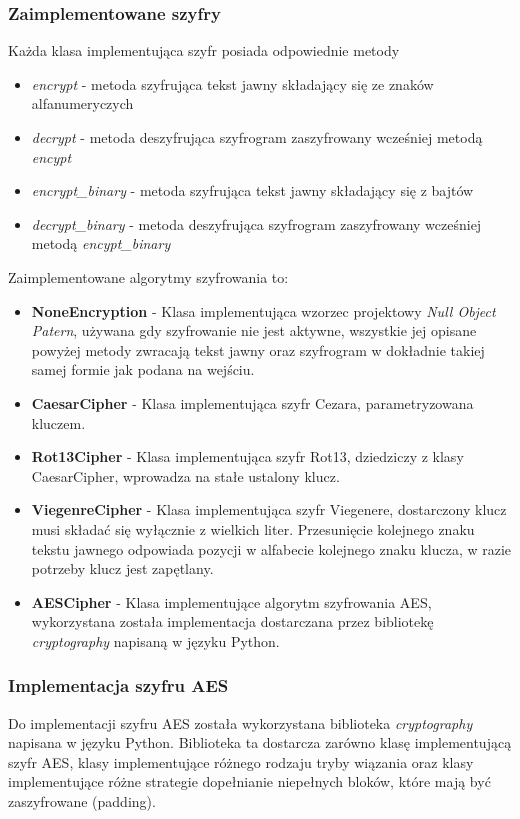 \documentclass{article}
\begin{document}
    \subsubsection{Zaimplementowane szyfry}
      Każda klasa implementująca szyfr posiada odpowiednie metody
      \begin{itemize}
          \item \emph{encrypt} - metoda szyfrująca tekst jawny składający się ze znaków alfanumeryczych
          \item \emph{decrypt} - metoda deszyfrująca szyfrogram zaszyfrowany wcześniej metodą \emph{encypt}
          \item \emph{encrypt\_binary} - metoda szyfrująca tekst jawny składający się z bajtów
          \item \emph{decrypt\_binary} - metoda deszyfrująca szyfrogram zaszyfrowany wcześniej metodą \emph{encypt\_binary}
      \end{itemize}

      Zaimplementowane algorytmy szyfrowania to:
      \begin{itemize}
          \item {\bfseries NoneEncryption} - Klasa implementująca wzorzec projektowy \emph{Null Object Patern}, używana
              gdy szyfrowanie nie jest aktywne, wszystkie jej opisane powyżej metody zwracają tekst jawny oraz szyfrogram
              w dokładnie takiej samej formie jak podana na wejściu.
          \item {\bfseries CaesarCipher} - Klasa implementująca szyfr Cezara, parametryzowana kluczem.
          \item {\bfseries Rot13Cipher} - Klasa implementująca szyfr Rot13, dziedziczy z klasy CaesarCipher, wprowadza
              na stałe ustalony klucz.
          \item {\bfseries ViegenreCipher} - Klasa implementująca szyfr Viegenere, dostarczony klucz musi składać się
              wyłącznie z wielkich liter. Przesunięcie kolejnego znaku tekstu jawnego odpowiada pozycji w alfabecie kolejnego
              znaku klucza, w razie potrzeby klucz jest zapętlany.
          \item {\bfseries AESCipher} - Klasa implementujące algorytm szyfrowania AES, wykorzystana została implementacja
              dostarczana przez bibliotekę \emph{cryptography} napisaną w języku Python.
      \end{itemize}

    \subsubsection{Implementacja szyfru AES}
      Do implementacji szyfru AES została wykorzystana biblioteka \emph{cryptography} napisana w języku Python. Biblioteka
      ta dostarcza zarówno klasę implementującą szyfr AES, klasy implementujące różnego rodzaju tryby wiązania oraz
      klasy implementujące różne strategie dopełnianie niepełnych bloków, które mają być zaszyfrowane (padding).
\end{document}
